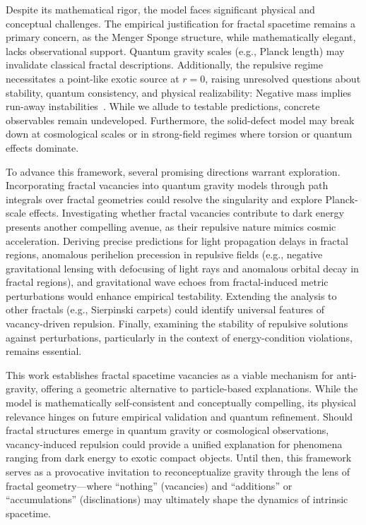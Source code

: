 \documentclass[%
  reprint,
  superscriptaddress,
  showpacs,
  showkeys,
  amsmath,amssymb,
  pra,
  longbibliography,
  floatfix,
]{revtex4-2}
\begin{document}
Despite its mathematical rigor, the model faces significant physical and conceptual challenges.
The empirical justification for fractal spacetime remains a primary concern, as the Menger Sponge structure,
while mathematically elegant, lacks observational support.
Quantum gravity scales (e.g., Planck length) may invalidate classical fractal descriptions.
Additionally, the repulsive regime necessitates a point-like exotic source at $r = 0$,
raising unresolved questions about stability, quantum consistency, and physical realizability:
Negative mass implies run-away instabilities~\cite{bondi-1957}.
While we allude to testable predictions, concrete observables remain undeveloped.
Furthermore, the solid-defect model may break down at cosmological scales or in strong-field regimes where torsion or quantum effects dominate.

To advance this framework, several promising directions warrant exploration.
Incorporating fractal vacancies into quantum gravity models through path integrals
over fractal geometries could resolve the singularity and explore Planck-scale effects.
Investigating whether fractal vacancies contribute to dark energy presents another compelling avenue,
as their repulsive nature mimics cosmic acceleration.
Deriving precise predictions for light propagation delays in fractal regions,
anomalous perihelion precession in repulsive fields (e.g., negative gravitational lensing with defocusing of light rays and anomalous orbital decay in fractal regions),
and gravitational wave echoes from fractal-induced metric perturbations would enhance empirical testability.
Extending the analysis to other fractals (e.g., Sierpinski carpets) could identify universal features of vacancy-driven repulsion.
Finally, examining the stability of repulsive solutions against perturbations, particularly in the context of energy-condition violations, remains essential.

This work establishes fractal spacetime vacancies as a viable mechanism for anti-gravity,
offering a geometric alternative to particle-based explanations.
 While the model is mathematically self-consistent and conceptually compelling,
its physical relevance hinges on future empirical validation and quantum refinement.
Should fractal structures emerge in quantum gravity or cosmological observations,
vacancy-induced repulsion could provide a unified explanation for phenomena ranging from dark energy to exotic compact objects.
Until then, this framework serves as a provocative invitation to reconceptualize gravity
through the lens of fractal geometry---where ``nothing'' (vacancies) and ``additions'' or ``accumulations'' (disclinations) may ultimately shape the dynamics of intrinsic spacetime.
\end{document}
